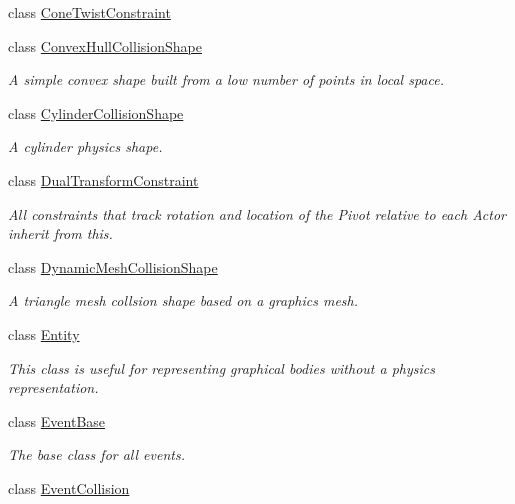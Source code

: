\begin{DoxyCompactItemize}
class \hyperlink{classMezzanine_1_1ConeTwistConstraint}{ConeTwistConstraint}
\item 
class \hyperlink{classMezzanine_1_1ConvexHullCollisionShape}{ConvexHullCollisionShape}
\begin{DoxyCompactList}\small\item\em A simple convex shape built from a low number of points in local space. \item\end{DoxyCompactList}\item 
class \hyperlink{classMezzanine_1_1CylinderCollisionShape}{CylinderCollisionShape}
\begin{DoxyCompactList}\small\item\em A cylinder physics shape. \item\end{DoxyCompactList}\item 
class \hyperlink{classMezzanine_1_1DualTransformConstraint}{DualTransformConstraint}
\begin{DoxyCompactList}\small\item\em All constraints that track rotation and location of the Pivot relative to each Actor inherit from this. \item\end{DoxyCompactList}\item 
class \hyperlink{classMezzanine_1_1DynamicMeshCollisionShape}{DynamicMeshCollisionShape}
\begin{DoxyCompactList}\small\item\em A triangle mesh collsion shape based on a graphics mesh. \item\end{DoxyCompactList}\item 
class \hyperlink{classMezzanine_1_1Entity}{Entity}
\begin{DoxyCompactList}\small\item\em This class is useful for representing graphical bodies without a physics representation. \item\end{DoxyCompactList}\item 
class \hyperlink{classMezzanine_1_1EventBase}{EventBase}
\begin{DoxyCompactList}\small\item\em The base class for all events. \item\end{DoxyCompactList}\item 
class \hyperlink{classMezzanine_1_1EventCollision}{EventCollision}

\end{DoxyCompactItemize}

